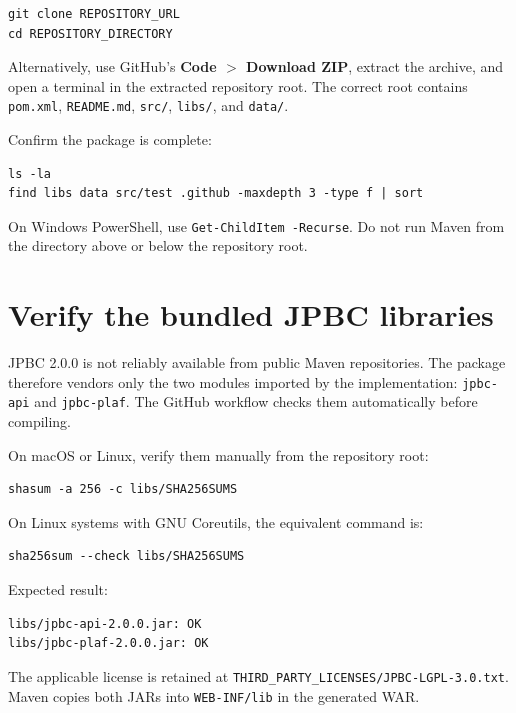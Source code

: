 \documentclass[11pt,a4paper]{article}
\begin{document}
\begin{lstlisting}[style=terminal]
git clone REPOSITORY_URL
cd REPOSITORY_DIRECTORY
\end{lstlisting}

Alternatively, use GitHub's \textbf{Code $>$ Download ZIP}, extract the archive, and open a terminal in the extracted repository root. The correct root contains \texttt{pom.xml}, \texttt{README.md}, \texttt{src/}, \texttt{libs/}, and \texttt{data/}.

Confirm the package is complete:

\begin{lstlisting}[style=terminal]
ls -la
find libs data src/test .github -maxdepth 3 -type f | sort
\end{lstlisting}

On Windows PowerShell, use \texttt{Get-ChildItem -Recurse}. Do not run Maven from the directory above or below the repository root.

\section{Verify the bundled JPBC libraries}

JPBC 2.0.0 is not reliably available from public Maven repositories. The package therefore vendors only the two modules imported by the implementation: \texttt{jpbc-api} and \texttt{jpbc-plaf}. The GitHub workflow checks them automatically before compiling.

On macOS or Linux, verify them manually from the repository root:

\begin{lstlisting}[style=terminal]
shasum -a 256 -c libs/SHA256SUMS
\end{lstlisting}

On Linux systems with GNU Coreutils, the equivalent command is:

\begin{lstlisting}[style=terminal]
sha256sum --check libs/SHA256SUMS
\end{lstlisting}

Expected result:

\begin{lstlisting}[style=terminal]
libs/jpbc-api-2.0.0.jar: OK
libs/jpbc-plaf-2.0.0.jar: OK
\end{lstlisting}

The applicable license is retained at \texttt{THIRD\_PARTY\_LICENSES/JPBC-LGPL-3.0.txt}. Maven copies both JARs into \texttt{WEB-INF/lib} in the generated WAR.
\end{document}
